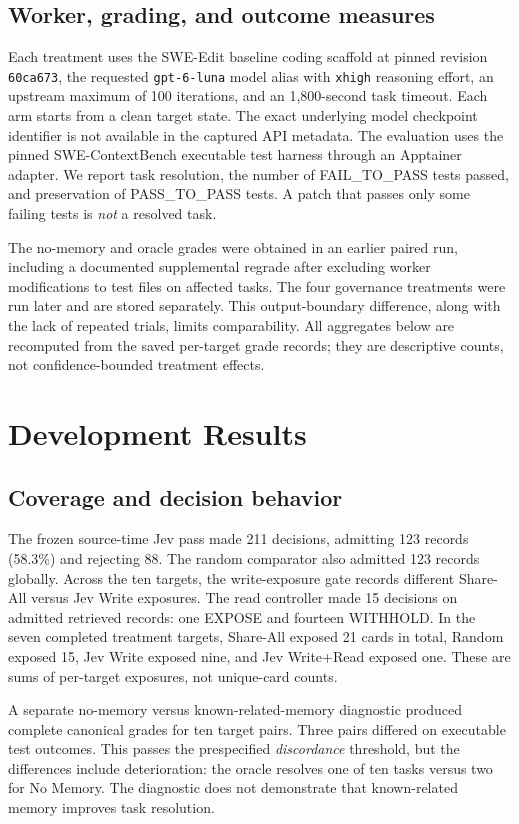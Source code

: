 \documentclass[sigconf,anonymous]{aamas}
\begin{document}
\subsection{Worker, grading, and outcome measures}
Each treatment uses the SWE-Edit baseline coding scaffold at pinned revision \texttt{60ca673}, the requested \texttt{gpt-6-luna} model alias with \texttt{xhigh} reasoning effort, an upstream maximum of 100 iterations, and an 1,800-second task timeout. Each arm starts from a clean target state. The exact underlying model checkpoint identifier is not available in the captured API metadata. The evaluation uses the pinned SWE-ContextBench executable test harness through an Apptainer adapter. We report task resolution, the number of FAIL\_TO\_PASS tests passed, and preservation of PASS\_TO\_PASS tests. A patch that passes only some failing tests is \emph{not} a resolved task.

The no-memory and oracle grades were obtained in an earlier paired run, including a documented supplemental regrade after excluding worker modifications to test files on affected tasks. The four governance treatments were run later and are stored separately. This output-boundary difference, along with the lack of repeated trials, limits comparability. All aggregates below are recomputed from the saved per-target grade records; they are descriptive counts, not confidence-bounded treatment effects.

\section{Development Results}
\subsection{Coverage and decision behavior}
The frozen source-time Jev pass made 211 decisions, admitting 123 records (58.3\%) and rejecting 88. The random comparator also admitted 123 records globally. Across the ten targets, the write-exposure gate records different Share-All versus Jev Write exposures. The read controller made 15 decisions on admitted retrieved records: one EXPOSE and fourteen WITHHOLD. In the seven completed treatment targets, Share-All exposed 21 cards in total, Random exposed 15, Jev Write exposed nine, and Jev Write+Read exposed one. These are sums of per-target exposures, not unique-card counts.

A separate no-memory versus known-related-memory diagnostic produced complete canonical grades for ten target pairs. Three pairs differed on executable test outcomes. This passes the prespecified \emph{discordance} threshold, but the differences include deterioration: the oracle resolves one of ten tasks versus two for No Memory. The diagnostic does not demonstrate that known-related memory improves task resolution.
\end{document}
